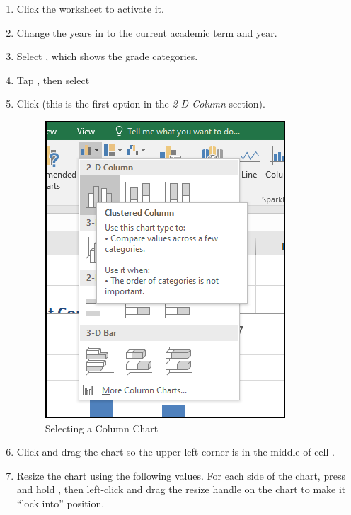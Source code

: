 \begin{enumbox}
	\begin{enumerate}
		\item Click the  worksheet to activate it.
		\item Change the years in  to the current academic term and year.
		\item Select , which shows the grade categories.
		\item Tap , then select 
		\item Click  (this is the first option in the \textit{2-D Column} section).
		
		\begin{figure}[H]
			\centering
			\includegraphics[width=\maxwidth{.65\linewidth}]{gfx/ch04_fig13}
			\caption{Selecting a Column Chart}
			\label{04:fig13}
		\end{figure}
			
		\item Click and drag the chart so the upper left corner is in the middle of cell .
		\item Resize the chart using the following values. For each side of the chart, press and hold , then left-click and drag the resize handle on the chart to make it ``lock into'' position.
	

\end{enumerate}
\end{enumbox}
